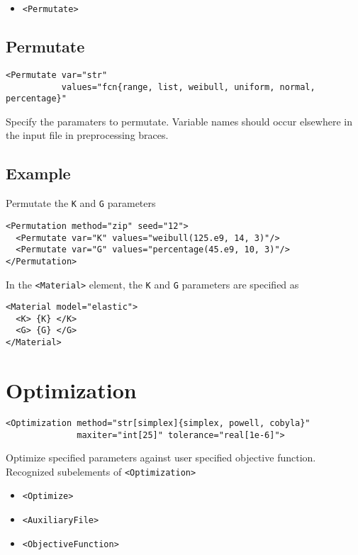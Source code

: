 \documentclass[11pt]{report}
\newcommand{\tag}[1]{\texttt{<#1>}}
\begin{document}
\begin{itemize}
  \item \tag{Permutate}
\end{itemize}

\subsection{Permutate}
\begin{verbatim}
<Permutate var="str"
           values="fcn{range, list, weibull, uniform, normal, percentage}"
\end{verbatim}
%
Specify the paramaters to permutate. Variable names should occur elsewhere in
the input file in preprocessing braces.

\subsection{Example}
Permutate the \texttt{K} and \texttt{G} parameters
%
\begin{verbatim}
<Permutation method="zip" seed="12">
  <Permutate var="K" values="weibull(125.e9, 14, 3)"/>
  <Permutate var="G" values="percentage(45.e9, 10, 3)"/>
</Permutation>
\end{verbatim}

In the \tag{Material} element, the \texttt{K} and \texttt{G} parameters are
specified as
%
\begin{verbatim}
<Material model="elastic">
  <K> {K} </K>
  <G> {G} </G>
</Material>
\end{verbatim}


\section{Optimization}
\begin{verbatim}
<Optimization method="str[simplex]{simplex, powell, cobyla}"
              maxiter="int[25]" tolerance="real[1e-6]">
\end{verbatim}
%
Optimize specified parameters against user specified objective function.
Recognized subelements of \tag{Optimization}

\begin{itemize}
  \item \tag{Optimize}
  \item \tag{AuxiliaryFile}
  \item \tag{ObjectiveFunction}
\end{itemize}
\end{document}
